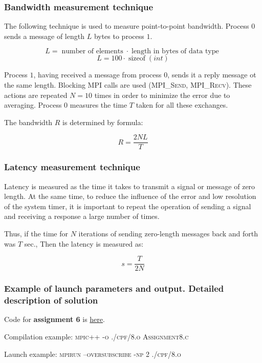 \documentclass[%
12pt, %
final, %
oneside, %
onecolumn, %
centertags]{article} %
\theoremstyle{plain}
\theoremstyle{definition}
\theoremstyle{remark}
\begin{document}
\subsubsection{Bandwidth measurement technique}

The following technique is used to measure point-to-point bandwidth. Process $0$ sends a message of length $L$ bytes to process $1$.

$$L = \operatorname{number \ of \ elements} \cdot \operatorname{length \ in \ bytes \ of \  data \ type}$$
$$L = 100 \cdot \operatorname{sizeof}(int)$$

Process $1$, having received a message from process $0$, sends it a reply message ot the same length. Blocking MPI calls are used (\textsc{MPI\_Send}, \textsc{MPI\_Recv}). These actions are repeated $N=10$ times in order to minimize the error due to averaging. Process $0$ measures the time $T$ taken for all these exchanges.

The bandwidth $R$ is determined by formula:

$$R = \frac{2NL}{T}$$

\subsubsection{Latency measurement technique}

Latency is measured as the time it takes to transmit a signal or message of zero 
length. At the same time, to reduce the influence of the error and low resolution of 
the system timer, it is important to repeat the operation of sending a signal and 
receiving a response a large number of times.

Thus, if the time for $N$ iterations of sending zero-length messages back and forth was $T$ sec., Then the latency is 
measured as:

$$s = \frac{T}{2N}$$

\subsubsection{Example of launch parameters and output. Detailed description of solution}

Code for \textbf{assignment 6} is \href{https:\//github.com/aptmess/parallel_algorithms/blob/master/HT/hw_mpi/Assignment8.c}{here}.

Compilation example: \textsc{mpic++ -o ./cpf/8.o Assignment8.c}

Launch example: \textsc{mpirun --oversubscribe -np 2 ./cpf/8.o}
\end{document}
